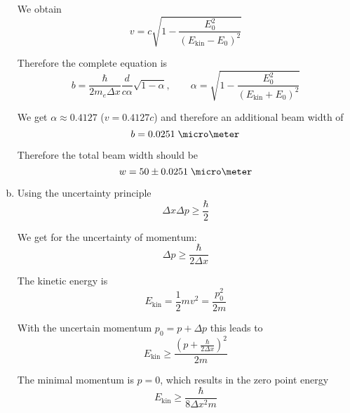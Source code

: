\documentclass[a4paper,german,12pt,smallheadings]{scrartcl}
\begin{document}
\begin{enumerate}[a)]
    We obtain
    \begin{equation*}
      v = c \sqrt{1- \frac{E_0^2}{(E_\text{kin} - E_0)^2}}
    \end{equation*}

    Therefore the complete equation is
    \begin{equation*}
      b = \frac{\hbar}{2 m_e \Delta x} \frac{d}{c \alpha} \sqrt{1 - \alpha},\qquad \alpha = \sqrt{1 - \frac{E_0^2}{(E_\text{kin} + E_0)^2}}
    \end{equation*}

    We get $\alpha \approx 0.4127$ ($v = 0.4127 c$) and therefore an additional beam width of
    \begin{equation*}
      b = 0.0251 \;\micro \meter
    \end{equation*}

    Therefore the total beam width should be
    \begin{equation*}
      w = 50 \pm 0.0251 \; \micro \meter
    \end{equation*}


  \item

    Using the uncertainty principle
    \begin{equation*}
      \Delta x \Delta p \ge \frac{\hbar}{2}
    \end{equation*}

    We get for the uncertainty of momentum:
    \begin{equation*}
      \Delta p \ge \frac{\hbar}{2 \Delta x}
    \end{equation*}

    The kinetic energy is
    \begin{equation*}
      E_\text{kin} = \frac{1}{2} mv^2 = \frac{p_0^2}{2m}
    \end{equation*}

    With the uncertain momentum $p_0 = p + \Delta p$ this leads to
    \begin{equation*}
      E_\text{kin} \ge \frac{(p + \frac{\hbar}{2 \Delta x})^2}{2m}
    \end{equation*}

    The minimal momentum is $p=0$, which results in the zero point energy
    \begin{equation*}
      E_\text{kin} \ge \frac{\hbar}{8 \Delta x^2 m}
    \end{equation*}


\end{enumerate}
\end{document}
